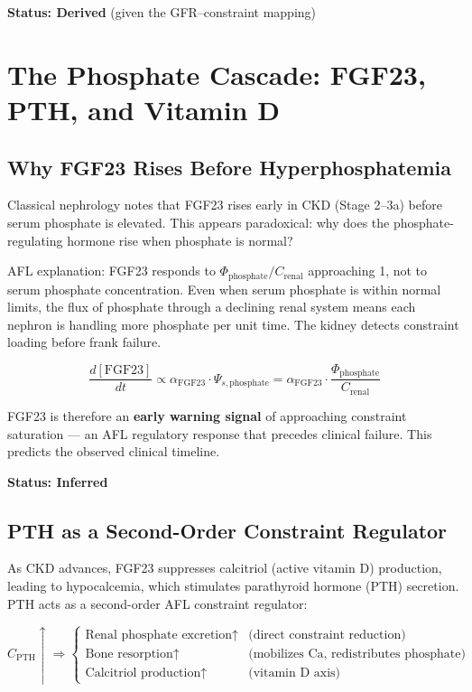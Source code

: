 \documentclass[12pt,a4paper]{article}
\begin{document}
\textbf{Status: Derived} (given the GFR--constraint mapping)

\section{The Phosphate Cascade: FGF23, PTH, and Vitamin D}

\subsection{Why FGF23 Rises Before Hyperphosphatemia}

Classical nephrology notes that FGF23 rises early in CKD (Stage 2--3a) before serum phosphate is elevated. This appears paradoxical: why does the phosphate-regulating hormone rise when phosphate is normal?

AFL explanation: FGF23 responds to $\Phi_{\mathrm{phosphate}} / C_{\mathrm{renal}}$ approaching 1, not to serum phosphate concentration. Even when serum phosphate is within normal limits, the flux of phosphate through a declining renal system means each nephron is handling more phosphate per unit time. The kidney detects constraint loading before frank failure.

\begin{equation}
    \frac{d[\mathrm{FGF23}]}{dt} \propto \alpha_{\mathrm{FGF23}} \cdot \Psi_{s,\mathrm{phosphate}} = \alpha_{\mathrm{FGF23}} \cdot \frac{\Phi_{\mathrm{phosphate}}}{C_{\mathrm{renal}}}
\end{equation}

FGF23 is therefore an \textbf{early warning signal} of approaching constraint saturation --- an AFL regulatory response that precedes clinical failure. This predicts the observed clinical timeline.

\textbf{Status: Inferred}

\subsection{PTH as a Second-Order Constraint Regulator}

As CKD advances, FGF23 suppresses calcitriol (active vitamin D) production, leading to hypocalcemia, which stimulates parathyroid hormone (PTH) secretion. PTH acts as a second-order AFL constraint regulator:

\begin{equation}
    C_{\mathrm{PTH}} \uparrow \Rightarrow \begin{cases}
        \text{Renal phosphate excretion} \uparrow & \text{(direct constraint reduction)} \\
        \text{Bone resorption} \uparrow & \text{(mobilizes Ca, redistributes phosphate)} \\
        \text{Calcitriol production} \uparrow & \text{(vitamin D axis)}
    \end{cases}
\end{equation}
\end{document}
